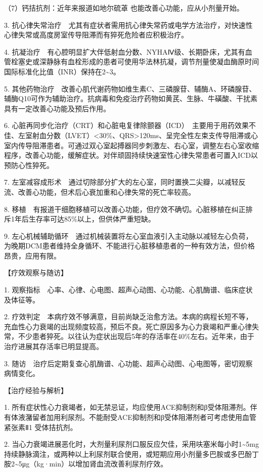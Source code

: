 （7）钙拮抗剂：近年来报道如地尔硫䓬
也能改善心功能，应从小剂量开始。

3.
抗心律失常治疗　尤其有症状者需用抗心律失常药或电学方法治疗，对快速性心律失常或高度房室传导阻滞而有猝死危险者应积极治疗。

4.
抗凝治疗　有心腔明显扩大伴低射血分数、NYHAⅣ级、长期卧床，尤其有血管栓塞史或深静脉有血栓形成的患者可使用华法林抗凝，调节剂量使凝血酶原时间国际标准化比值（INR）保持在2\textasciitilde{}3。

5.
其他药物治疗　改善心肌代谢药物如维生素C、三磷腺苷、辅酶A、环磷腺苷、辅酶Q10可作为辅助治疗。抗病毒和免疫治疗药物如黄芪、生脉、牛磺酸、干扰素具有一定改善心功能及预后作用。

6.
心脏再同步化治疗（CRT）和心脏电复律除颤器（ICD）　主要用于用药效果不佳、左室射血分数（LVET）\textless{}30\%、QRS\textgreater{}120ms、呈完全性左束支传导阻滞或心室内传导阻滞患者。可通过双心室起搏器同步刺激左、右心室，调整左右心室收缩程序，改善心功能，缓解症状。对伴顽固持续快速室性心律失常患者可置入ICD以预防心性猝死。

7.
左室减容成形术　通过切除部分扩大的左心室，同时置换二尖瓣，以减轻反流、改善心功能，但术后心衰加重和心律失常的死亡率较高。

8.
移植　有报道干细胞移植可以改善心功能，但疗效不确切。心脏移植在纠正排斥1年后生存率可达85\%以上，但供体严重短缺。

9.
左心机械辅助循环　通过机械装置将左心室血液引入主动脉以减轻左心负荷，为晚期DCM患者维持全身循环、不能进行心脏移植患者的一种有效方法，但价格昂贵，应用有限。

【疗效观察与随访】

1.
观察指标　心率、心律、心电图、超声心动图、心功能、心肌酶谱、临床症状及体征等。

2.
疗效判定　本病疗效不够满意，目前尚缺乏治愈方法。本病的病程长短不等，充血性心力衰竭的出现频度较高，预后不良。死亡原因多为心力衰竭和严重心律失常，不少患者猝死。以往认为症状出现后5年的存活率在40\%左右。近年来，由于治疗进展其存活率已明显提高。

3.
随访　治疗后定期复查心肌酶谱、心功能、超声心动图、心电图等，密切观察病情变化。

【治疗经验与解析】

1.
所有症状性心力衰竭者，如无禁忌证，均应使用ACE抑制剂和β受体阻滞剂。伴有体液潴留者加用利尿剂。不能耐受ACE抑制剂和β受体阻滞剂者可考虑使用血管紧张素Ⅱ{1}
受体拮抗剂。

2.
当心力衰竭进展恶化时，大剂量利尿剂口服反应欠佳，采用呋塞米每小时1\textasciitilde{}5mg持续静脉滴注，或两种以上利尿剂联合使用，或短期应用小剂量多巴胺或多巴酚丁胺2\textasciitilde{}5μg（kg·min）以增加肾血流改善利尿剂疗效。

